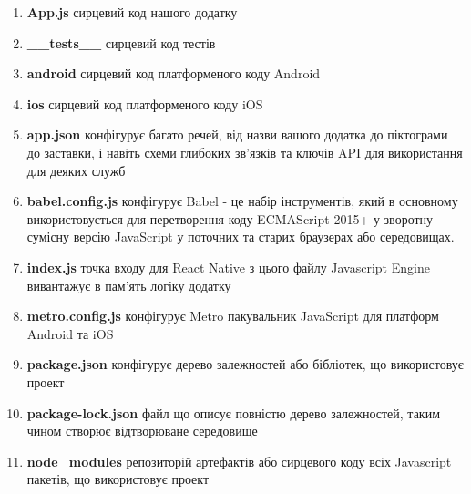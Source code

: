 \begin{enumerate}
    \item \textbf{App.js} сирцевий код нашого додатку
    \item \textbf{\_\_tests\_\_} сирцевий код тестів
    \item \textbf{android} сирцевий код платформеного коду Android
    \item \textbf{ios} сирцевий код платформеного коду iOS
    \item \textbf{app.json} конфігурує багато речей, від назви вашого додатка до піктограми до заставки, і навіть схеми глибоких зв’язків та ключів API для використання для деяких служб
    \item \textbf{babel.config.js} конфігурує Babel - це набір інструментів, який в основному використовується для перетворення коду ECMAScript 2015+ у зворотну сумісну версію JavaScript у поточних та старих браузерах або середовищах.
    \item \textbf{index.js} точка входу для React Native з цього файлу Javascript Engine вивантажує в пам'ять логіку додатку
    \item \textbf{metro.config.js} конфігурує Metro пакувальник JavaScript для платформ Android та iOS
    \item \textbf{package.json} конфігурує дерево залежностей або бібліотек, що використовує проект
    \item \textbf{package-lock.json} файл що описує повністю дерево залежностей, таким чином створює відтворюване середовище
    \item \textbf{node\_modules} репозиторій артефактів або сирцевого коду всіх Javascript пакетів, що використовує проект
\end{enumerate}
